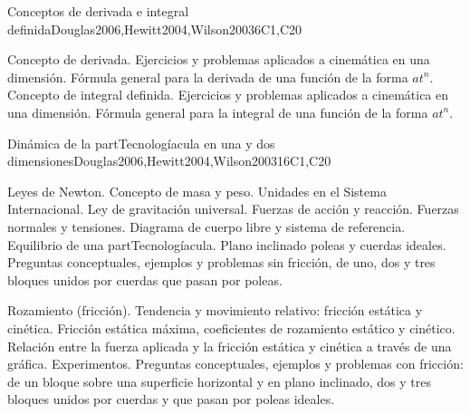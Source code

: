 \begin{syllabus}
\begin{unit}{Conceptos de derivada e integral definida}{}{Douglas2006,Hewitt2004,Wilson2003}{6}{C1,C20}
\begin{topics}
      \item Concepto de derivada. Ejercicios y problemas aplicados a cinemática en una dimensión. Fórmula general para la derivada de una función de la forma $at^{n}$. Concepto de integral definida. Ejercicios y problemas aplicados a cinemática en una dimensión. Fórmula general para la integral de una función de la forma $at^{n}$.
\end{topics}

\end{unit}

\begin{unit}{Dinámica de la partTecnologíacula en una y dos dimensiones}{}{Douglas2006,Hewitt2004,Wilson2003}{16}{C1,C20}
\begin{topics}
      \item Leyes de Newton. Concepto de masa y peso. Unidades en el Sistema Internacional. Ley de gravitación universal. Fuerzas de acción y reacción. Fuerzas normales y tensiones. Diagrama de cuerpo libre y sistema de referencia. Equilibrio de una partTecnologíacula. Plano inclinado poleas y cuerdas ideales. Preguntas conceptuales, ejemplos y problemas sin fricción, de uno, dos y tres bloques unidos por cuerdas que pasan por poleas.
      \item Rozamiento (fricción). Tendencia y movimiento relativo: fricción estática y cinética. Fricción estática máxima, coeficientes de rozamiento estático y cinético. Relación entre la fuerza aplicada y la fricción estática y cinética a través de una gráfica. Experimentos. Preguntas conceptuales, ejemplos y problemas con fricción: de un bloque sobre una superficie horizontal y en plano inclinado, dos y tres bloques unidos por cuerdas y que pasan por poleas ideales.
   \end{topics}
\end{unit}



\begin{coursebibliography}
\end{coursebibliography}

\end{syllabus}
